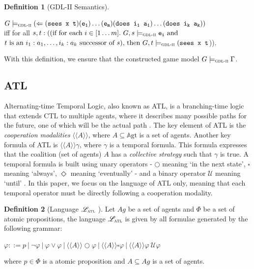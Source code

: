 \documentclass{article}
\theoremstyle{theorem}
\theoremstyle{lemma}
\theoremstyle{definition}
\newtheorem{definition}{Definition}[section]
\theoremstyle{remark}
\begin{document}
\begin{definition}[GDL-II Semantics]
\begin{tabbing}
    \> $G \models_\textsc{gdl-ii} (\Leftarrow(\texttt{sees x t}) (\texttt{e\textsubscript{1}}) \ldots(\texttt{e\textsubscript{m}}) (\texttt{does i\textsubscript{1} a\textsubscript{1}}) \ldots(\texttt{does i\textsubscript{k} a\textsubscript{k}}))$\\
    \>\hspace{1cm} iff for all $s,t:((\text{if for each } i \in [1\ldots m].\ G, s \models_\textsc{gdl-ii} \texttt{e\textsubscript{i}}\text{ and }$\\
    \>\hspace{3.4cm} $t \text{ is an } i_1:a_1,\ldots,i_k:a_k \text{ successor of }s)\text{, then } G,t \models_\textsc{gdl-ii} (\texttt{sees x t}$)).
    \end{tabbing}
    With this definition, we ensure that the constructed game model $G \models_\textsc{gdl-ii} \Gamma$.
\end{definition}


\subsection{ATL}
\par Alternating-time Temporal Logic, also known as ATL, is a branching-time logic that extends CTL to multiple agents, where it describes many possible paths for the future, one of which will be the actual path \citep{ctl}. The key element of ATL is the \textit{cooperation modalities} $\langle{\langle{A}\rangle}\rangle$, where $A \subseteq \mathbb{A}\mathrm{gt}$ is a set of agents. Another key formula of ATL is $\langle{\langle{A}\rangle}\rangle \gamma$, where $\gamma$ is a temporal formula. This formula expresses that the coalition (set of agents) $A$ has a \textit{collective strategy} such that $\gamma$ is true. A temporal formula is built using unary operators - $\bigcirc$ meaning `in the next state', $\square$ meaning `always', $\Diamond$ meaning `eventually' - and a binary operator $\mathcal{U}$ meaning `until' \citep{GDLpaper}. In this paper, we focus on the language of ATL only, meaning that each temporal operator must be directly following a cooperation modality.
\begin{definition}[Language $\mathscr{L}_\textsc{atl}$ \citep{cgs}]
    Let $Ag$ be a set of agents and $\Phi$ be a set of atomic propositions, the language $\mathscr{L}_\textsc{atl}$ is given by all formulae generated by the following grammar:
    \begin{center}
        \par $\varphi ::= p\:|\: \neg \varphi \:|\: \varphi \vee \varphi \:|\: \langle{\langle{A}\rangle}\rangle \bigcirc \varphi \:|\: \langle{\langle{A}\rangle}\rangle \square \varphi \:|\: \langle{\langle{A}\rangle}\rangle \varphi \: \mathcal{U} \varphi$
    \end{center}
    where $p \in \Phi$ is a atomic proposition and $A \subseteq Ag$ is a set of agents.
\end{definition}
\end{document}
